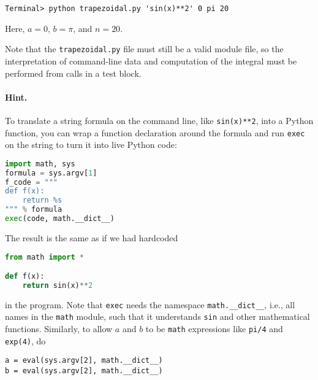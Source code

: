 \documentclass[graybox,sectrefs,envcountresetchap,open=right,final]{svmonodo}
\newenvironment{doconceexercise}{}{}
\begin{document}
\begin{doconceexercise}
\begin{Verbatim}[frame=lines,label=\fbox{{\tiny Terminal}},framesep=2.5mm,framerule=0.7pt,fontsize=\fontsize{9pt}{9pt}]
Terminal> python trapezoidal.py 'sin(x)**2' 0 pi 20

\end{Verbatim}

Here, $a=0$, $b=\pi$, and $n=20$.

Note that the \texttt{trapezoidal.py} file must still be a valid module file, so the
interpretation of command-line data and computation of the integral
must be performed from calls in a test block.


\paragraph{Hint.}
To translate a string formula on the command line, like \texttt{sin(x)**2},
into a Python function, you can wrap a function declaration around
the formula and run \texttt{exec} on the string to turn it into live Python code:









\begin{lstlisting}[language=python,style=blue1_bluegreen]
import math, sys
formula = sys.argv[1]
f_code = """
def f(x):
    return %s
""" % formula
exec(code, math.__dict__)

\end{lstlisting}

The result is the same as if we had hardcoded






\begin{lstlisting}[language=python,style=blue1_bluegreen]
from math import *

def f(x):
    return sin(x)**2

\end{lstlisting}

in the program. Note that \texttt{exec} needs the namespace
\Verb!math.__dict__!, i.e., all names in the \texttt{math} module, such that
it understands \texttt{sin} and other mathematical functions.
Similarly, to allow $a$ and $b$ to be \texttt{math} expressions like \texttt{pi/4}
and \texttt{exp(4)}, do




\begin{Verbatim}[frame=lines,label=\fbox{{\tiny Terminal}},framesep=2.5mm,framerule=0.7pt,fontsize=\fontsize{9pt}{9pt}]
a = eval(sys.argv[2], math.__dict__)
b = eval(sys.argv[2], math.__dict__)


\end{Verbatim}
\end{doconceexercise}
\end{document}
